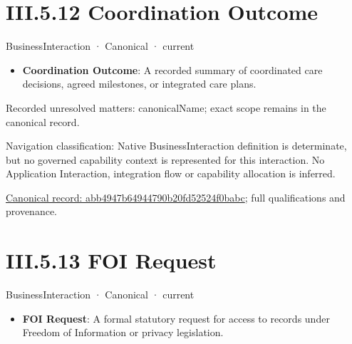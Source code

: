 \section*{III.5.12 Coordination Outcome}
\label{navigation:III.5.12}

\label{element:abb4947b64944790b20fd52524f0babc}
{\small BusinessInteraction · Canonical · current}\par

\begin{itemize}


\item \textbf{Coordination Outcome}: A recorded summary of coordinated care decisions, agreed milestones, or integrated care plans.

\end{itemize}

{\small Recorded unresolved matters: canonicalName; exact scope remains in the canonical record.}\par
{\small Navigation classification: Native BusinessInteraction definition is determinate, but no governed capability context is represented for this interaction. No Application Interaction, integration flow or capability allocation is inferred.}\par
{\footnotesize \href{../../../../../../../../continuum/business/business-interaction/abb4947b64944790b20fd52524f0babc.md}{Canonical record: abb4947b64944790b20fd52524f0babc}; full qualifications and provenance.}\par
\section*{III.5.13 FOI Request}
\label{navigation:III.5.13}

\label{element:2c7ca48559fb4a72b4d9c250df4015ce}
{\small BusinessInteraction · Canonical · current}\par

\begin{itemize}


\item \textbf{FOI Request}: A formal statutory request for access to records under Freedom of Information or privacy legislation.

\end{itemize}

